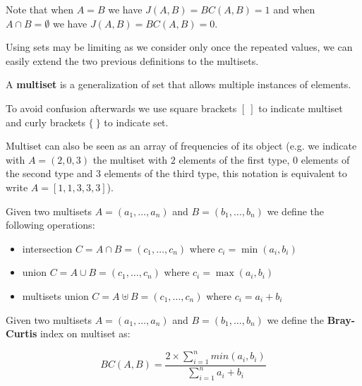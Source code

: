 Note that when $A = B$ we have $J(A, B) = BC(A, B) = 1$ and when $A \cap B = \emptyset$ we have $J (A, B) = BC (A, B) = 0$.

Using sets may be limiting as we consider only once the repeated values, we can easily extend the two previous definitions to the multisets.\medskip

\begin{definizione}
	A \textbf{multiset} is a generalization of set that allows multiple instances of elements.
\end{definizione}

To avoid confusion afterwards we use square brackets $[\ ]$ to indicate multiset and curly brackets $\{\ \}$ to indicate set.\medskip

Multiset can also be seen as an array of frequencies of its object (e.g. we indicate with $A = (2, 0, 3)$ the multiset with $2$ elements of the first type, $0$ elements of the second type and $3$ elements of the third type, this notation is equivalent to write $A = [1, 1, 3, 3, 3]$).\medskip

Given two multisets $A = (a_{1}, \ldots, a_{n}) $ and $B = (b_{1}, \ldots, b_{n})$ we define the following operations:

\begin{itemize}
	\item intersection $C = A \cap B  = (c_{1}, \ldots, c_{n})$ where $c_{i} = \min(a_{i}, b_{i})$
	\item union $C = A \cup B  = (c_{1}, \ldots, c_{n})$ where $c_{i} = \max(a_{i}, b_{i})$
	\item multisets union $C = A \uplus B  = (c_{1}, \ldots, c_{n})$ where $c_{i} = a_{i} + b_{i}$
\end{itemize}

%     


\begin{definizione}\label{def:wbray}
	Given two multisets $A = (a_{1}, \ldots, a_{n}) $ and $B = (b_{1}, \ldots, b_{n})$ we define the \textbf{Bray-Curtis} index on multiset as:
	
	\begin{equation}
	BC(A,B) = \frac{ 2 \times \sum\limits_{i=1}^n { min(a_{i}, b_{i}) } }{\sum\limits_{i=1}^n {a_{i} + b_{i}}}
	\end{equation}
	
\end{definizione}


